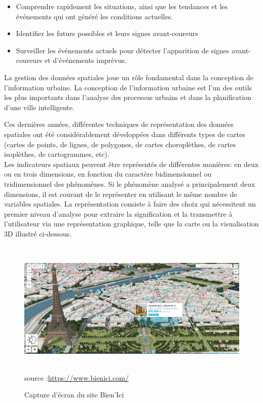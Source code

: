 \documentclass[french, a4paper, 12pt]{report}
\begin{document}
\begin{itemize}
\item Comprendre rapidement les situations, ainsi que les tendances et les événements qui ont généré les conditions actuelles.
\item Identifier les futurs possibles et leurs signes avant-coureurs
\item Surveiller les événements actuels pour détecter l'apparition de signes avant-coureurs et d'événements imprévus.\\
\end{itemize}

La gestion des données spatiales joue un rôle fondamental dans la conception de l’information urbaine. La conception de l'information urbaine est l'un des outils les plus importants dans l'analyse des processus urbains et dans la planification d'une ville intelligente.

Ces dernières années, différentes techniques de représentation des données spatiales ont été considérablement développées dans différents types de cartes (cartes de points, de lignes, de polygones, de cartes choroplèthes, de cartes isoplèthes, de cartogrammes, etc).\\ Les indicateurs spatiaux peuvent être représentés de différentes manières: en deux ou en trois dimensions, en fonction du caractère bidimensionnel ou tridimensionnel des phénomènes. Si le phénomène analysé a principalement deux dimensions, il est courant de le représenter en utilisant le même nombre de variables spatiales. 
La représentation consiste à faire des choix qui nécessitent un premier niveau d’analyse pour extraire la signification et la transmettre à l’utilisateur via une représentation graphique, telle que la carte ou la visualisation 3D illustré ci-dessous. 
\begin{figure}[!htb]
    \centering
    \includegraphics[height=6.5cm]{images/bienIci.jpg}
    \scriptsize{source :\url{https://www.bienici.com/}}
    \caption{Capture d'écran du site Bien'Ici}
    \label{fig:2.9}
\end{figure}
\end{document}
